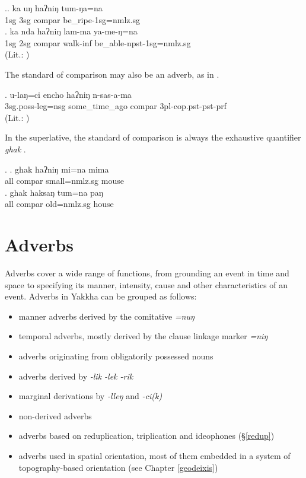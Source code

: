 \ex.\ag. ka uŋ haʔniŋ  tum-ŋa=na\\
			{\sc 1sg} {\sc 3sg}  {\sc compar} be\_ripe-{\sc 1sg=nmlz.sg}	\\
	 \bg.  ka nda haʔniŋ lam-ma ya-me-ŋ=na\\
			{\sc 1sg} {\sc 2sg}  {\sc compar}  walk{\sc -inf} be\_able{\sc -npst-1sg=nmlz.sg}\\
	 (Lit.: )
	
The standard of comparison may also be an adverb, as in \Next. 

\exg. u-laŋ=ci encho haʔniŋ n-sas-a-ma\\
		{\sc 3sg.poss}-leg{\sc =nsg} some\_time\_ago {\sc compar} {\sc 3pl-cop.pst-pst-prf}\\
	 (Lit.: )

In the superlative, the standard of comparison is always the exhaustive quantifier \emph{ghak}  \Next. 

\ex. \ag. ghak haʔniŋ mi=na  mima\\
	all {\sc compar} small{\sc =nmlz.sg} mouse\\
 
\bg. ghak haksaŋ tum=na  paŋ\\
all  {\sc compar} old{\sc =nmlz.sg} house\\
 


\section{Adverbs}\label{adv}

Adverbs cover a wide range of functions, from grounding an event in time and space to specifying its manner, intensity, cause and other characteristics of an event. Adverbs in Yakkha can be grouped as follows:

\begin{itemize}
\item manner adverbs derived by the comitative \emph{=nuŋ}
\item temporal adverbs, mostly derived by the clause linkage marker  \emph{=niŋ} 
\item adverbs originating from obligatorily possessed nouns
\item adverbs derived by \emph{-lik \ti -lek \ti -rik}
\item marginal derivations by \emph{-lleŋ} and \emph{-ci(k)}
\item non-derived adverbs
\item adverbs based on reduplication, triplication and ideophones (§\ref{redup})
\item adverbs used in spatial orientation, most of them embedded in a system of topography-based orientation (see Chapter \ref{geodeixis})
\end{itemize}

